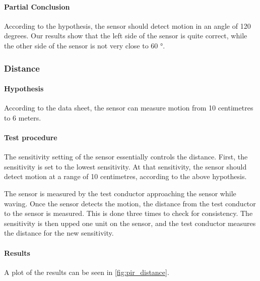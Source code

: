 \paragraph{Partial Conclusion}
\label{subp:AngPartial_conclusion}

According to the hypothesis, the sensor should detect motion in an angle of 120 degrees. Our results show that the left side of the sensor is quite correct, while the other side of the sensor is not very close to 60 $\si{\degree}$.

\subsubsection{Distance}

\paragraph{Hypothesis}

According to the data sheet, the sensor can measure motion from 10 centimetres to
6 meters.

\paragraph{Test procedure}

The sensitivity setting of the sensor essentially controls the distance. First,
the sensitivity is set to the lowest sensitivity. At that sensitivity, the
sensor should detect motion at a range of 10 centimetres, according to the above
hypothesis.

The sensor is measured by the test conductor approaching the sensor while
waving. Once the sensor detects the motion, the distance from the test conductor
to the sensor is measured. This is done three times to check for consistency. The sensitivity is then upped one unit on the sensor,
and the test conductor measures the distance for the new sensitivity.

\paragraph{Results}

A plot of the results can be seen in \cref{fig:pir_distance}.

